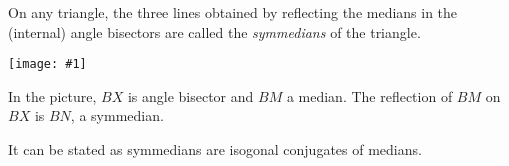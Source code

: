 \documentclass[12pt]{article}
\newcommand{\figura}[1]{\begin{center}\texttt{[image: \#1]}\end{center}}
\begin{document}
On any triangle, the three lines obtained by reflecting the medians in the (internal) angle bisectors are called the \emph{symmedians} of the triangle.

\figura{symmed}
In the picture, $BX$ is angle bisector and $BM$ a median. The reflection of $BM$ on $BX$ is $BN$, a symmedian.

It can be stated as symmedians are isogonal conjugates of medians.
\end{document}
